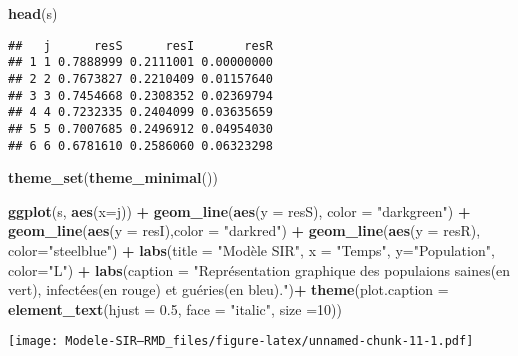\documentclass[
]{article}
\newenvironment{Shaded}{\begin{snugshade}}{\end{snugshade}}
\newcommand{\DataTypeTok}[1]{\textcolor[rgb]{0.13,0.29,0.53}{#1}}
\newcommand{\DecValTok}[1]{\textcolor[rgb]{0.00,0.00,0.81}{#1}}
\newcommand{\FloatTok}[1]{\textcolor[rgb]{0.00,0.00,0.81}{#1}}
\newcommand{\KeywordTok}[1]{\textcolor[rgb]{0.13,0.29,0.53}{\textbf{#1}}}
\newcommand{\NormalTok}[1]{#1}
\newcommand{\OperatorTok}[1]{\textcolor[rgb]{0.81,0.36,0.00}{\textbf{#1}}}
\newcommand{\StringTok}[1]{\textcolor[rgb]{0.31,0.60,0.02}{#1}}
\begin{document}
\begin{Shaded}
\begin{Highlighting}[]
\KeywordTok{head}\NormalTok{(s)}
\end{Highlighting}
\end{Shaded}

\begin{verbatim}
##   j      resS      resI       resR
## 1 1 0.7888999 0.2111001 0.00000000
## 2 2 0.7673827 0.2210409 0.01157640
## 3 3 0.7454668 0.2308352 0.02369794
## 4 4 0.7232335 0.2404099 0.03635659
## 5 5 0.7007685 0.2496912 0.04954030
## 6 6 0.6781610 0.2586060 0.06323298
\end{verbatim}

\begin{Shaded}
\begin{Highlighting}[]
\KeywordTok{theme_set}\NormalTok{(}\KeywordTok{theme_minimal}\NormalTok{())}

\KeywordTok{ggplot}\NormalTok{(s, }\KeywordTok{aes}\NormalTok{(}\DataTypeTok{x=}\NormalTok{j)) }\OperatorTok{+}\StringTok{ }\KeywordTok{geom_line}\NormalTok{(}\KeywordTok{aes}\NormalTok{(}\DataTypeTok{y =}\NormalTok{ resS), }\DataTypeTok{color =} \StringTok{"darkgreen"}\NormalTok{) }\OperatorTok{+}\StringTok{ }\KeywordTok{geom_line}\NormalTok{(}\KeywordTok{aes}\NormalTok{(}\DataTypeTok{y =}\NormalTok{ resI),}\DataTypeTok{color =} \StringTok{"darkred"}\NormalTok{) }\OperatorTok{+}\StringTok{ }\KeywordTok{geom_line}\NormalTok{(}\KeywordTok{aes}\NormalTok{(}\DataTypeTok{y =}\NormalTok{ resR), }\DataTypeTok{color=}\StringTok{"steelblue"}\NormalTok{) }\OperatorTok{+}\StringTok{ }\KeywordTok{labs}\NormalTok{(}\DataTypeTok{title =} \StringTok{"Modèle SIR"}\NormalTok{, }\DataTypeTok{x =} \StringTok{"Temps"}\NormalTok{, }\DataTypeTok{y=}\StringTok{"Population"}\NormalTok{, }\DataTypeTok{color=}\StringTok{"L"}\NormalTok{) }\OperatorTok{+}\StringTok{ }\KeywordTok{labs}\NormalTok{(}\DataTypeTok{caption =} \StringTok{"Représentation graphique des populaions saines(en vert), infectées(en rouge) et guéries(en bleu)."}\NormalTok{)}\OperatorTok{+}\StringTok{ }\KeywordTok{theme}\NormalTok{(}\DataTypeTok{plot.caption =} \KeywordTok{element_text}\NormalTok{(}\DataTypeTok{hjust =} \FloatTok{0.5}\NormalTok{, }\DataTypeTok{face =} \StringTok{"italic"}\NormalTok{, }\DataTypeTok{size =}\DecValTok{10}\NormalTok{))}
\end{Highlighting}
\end{Shaded}

\texttt{[image: Modele-SIR---RMD\_files/figure-latex/unnamed-chunk-11-1.pdf]}
\end{document}
